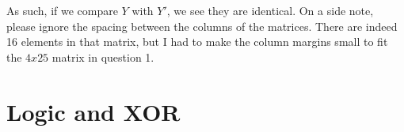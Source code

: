 \documentclass[11pt,english]{article}
\begin{document}
\begin{enumerate}
	
	As such, if we compare $Y$ with $Y'$, we see they are identical. On a side note, please ignore the spacing between the columns of the matrices. There are indeed 16 elements in that matrix, but I had to make the column margins small to fit the $4x25$ matrix in question 1.
\end{enumerate}
\pagebreak

\section{Logic and XOR}
\end{document}
